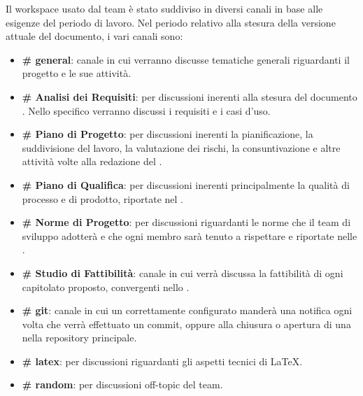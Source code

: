 			Il workspace usato dal team è stato suddiviso in diversi canali in base alle esigenze del periodo di lavoro. 
			Nel periodo relativo alla stesura della versione attuale del documento, i vari canali sono:
			\begin{itemize}
				\item \textbf{\# general}: canale in cui verranno discusse tematiche generali riguardanti il progetto e le sue attività.
				\item \textbf{\# Analisi dei Requisiti}: per discussioni inerenti alla stesura del documento \Doc{\AdR}. Nello specifico verranno discussi i requisiti e i casi d'uso.
				\item \textbf{\# Piano di Progetto}: per discussioni inerenti la pianificazione, la suddivisione del lavoro, la valutazione dei rischi, la consuntivazione e altre attività volte alla redazione del \PdP.
				\item \textbf{\# Piano di Qualifica}: per discussioni inerenti principalmente la qualità di processo e di prodotto, riportate nel \PdQ.
				\item \textbf{\# Norme di Progetto}: per discussioni riguardanti le norme che il team di sviluppo adotterà e che ogni membro sarà tenuto a rispettare e riportate nelle \NdP.
				\item \textbf{\# Studio di Fattibilità}: canale in cui verrà discussa la fattibilità di ogni capitolato proposto, convergenti nello \SdF.
				\item \textbf{\# git}: canale in cui un  correttamente configurato manderà una notifica ogni volta che verrà effettuato un commit, oppure alla chiusura o apertura di una  nella repository principale.
				\item \textbf{\# latex}: per discussioni riguardanti gli aspetti tecnici di \LaTeX.
				\item \textbf{\# random}: per discussioni off-topic del team. %
			\end{itemize}

